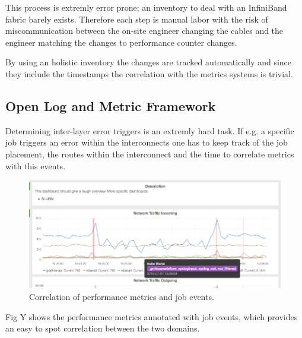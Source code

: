 This process is extremly error prone; an inventory to deal with an InfiniBand fabric barely exists. Therefore each step is manual labor with the risk of miscommunication between the on-site engineer changing the
cables and the engineer matching the changes to performance counter changes.

By using an holistic inventory the changes are tracked automatically and since they include the timestamps the correlation with the metrics systems is trivial.

\subsection{Open Log and Metric Framework}
Determining inter-layer error triggers is an extremly hard task. If e.g. a specific job triggers an error within the interconnects one has to keep track of the job placement, the routes within the interconnect and
the time to correlate metrics with this events.

\begin{figure}[!ht]
    \includegraphics[width=.4\textwidth]{images/png/mon_cor.png}
    \caption{\label{fig:job_correlation}Correlation of performance metrics and job events.}
\end{figure}
Fig Y shows the performance metrics annotated with job events, which provides an easy to spot correlation between the two domains.